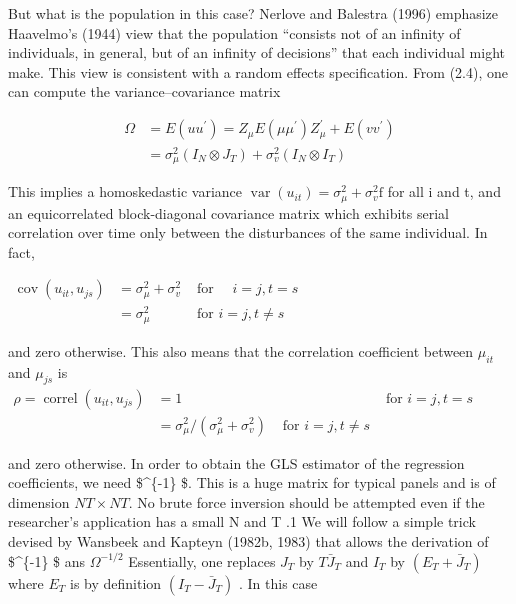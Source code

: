 \documentclass[
]{book}
\begin{document}
But what is the population in this case? Nerlove and Balestra (1996) emphasize Haavelmo's (1944) view that the population ``consists not of an infinity of individuals, in general, but of an infinity of decisions'' that each individual might make. This view is consistent with a random effects specification. From (2.4), one can compute the variance--covariance matrix

\begin{equation}
\begin{aligned}
\Omega &=E\left(u u^{\prime}\right)=Z_{\mu} E\left(\mu \mu^{\prime}\right) Z_{\mu}^{\prime}+E\left(v v^{\prime}\right) \\
&=\sigma_{\mu}^{2}\left(I_{N} \otimes J_{T}\right)+\sigma_{v}^{2}\left(I_{N} \otimes I_{T}\right)
\end{aligned}
\end{equation}

This implies a homoskedastic variance \(\operatorname{var}\left(u_{i t}\right)=\sigma_{\mu}^{2}+\sigma_{v}^{2} \mathrm{f}\) for all i and t, and an equicorrelated block-diagonal covariance matrix which exhibits serial correlation over time only between the disturbances of the same individual. In fact,

\(\begin{aligned} \operatorname{cov}\left(u_{i t}, u_{j s}\right) &=\sigma_{\mu}^{2}+\sigma_{v}^{2} & \text { for } \quad i=j, t=s \\ &=\sigma_{\mu}^{2} & \text { for } i=j, t \neq s \end{aligned}\)

and zero otherwise. This also means that the correlation coefficient between \(\mu _{it}\) and \(\mu _{js}\) is \(\begin{aligned} \rho=\operatorname{correl}\left(u_{i t}, u_{j s}\right) &=1 & & \text { for } i=j, t=s \\ &=\sigma_{\mu}^{2} /\left(\sigma_{\mu}^{2}+\sigma_{v}^{2}\right) & \text { for } i=j, t \neq s \end{aligned}\)

and zero otherwise. In order to obtain the GLS estimator of the regression coefficients, we need \$\Omega \^{}\{-1\} \$. This is a huge matrix for typical panels and is of dimension \(NT × NT\). No brute force inversion should be attempted even if the researcher's application has a small N and T .1 We will follow a simple trick devised by Wansbeek and Kapteyn (1982b, 1983) that allows the derivation of \$\Omega \^{}\{-1\} \$ ans \(\Omega^{-1 / 2}\) Essentially, one replaces \(J_{T}\) by \(T \bar{J}_{T}\) and \(I_{T}\) by \(\left(E_{T}+\bar{J}_{T}\right)\) where \(E_T\) is by definition \(\left(I_{T}-\bar{J}_{T}\right)\) . In this case
\end{document}
